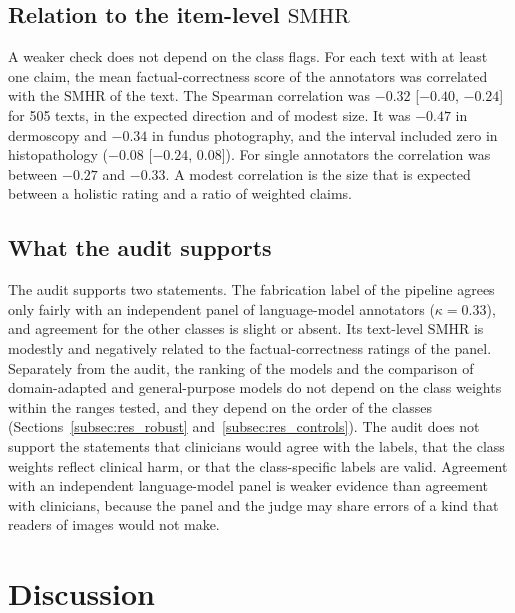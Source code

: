 \documentclass[11pt,a4paper]{article}
\newcommand{\SMHR}{\ensuremath{\mathrm{SMHR}}}
\begin{document}
\subsection{Relation to the item-level \SMHR{}}\label{sec:val_smhr}
A weaker check does not depend on the class flags. For each text with at least one claim, the mean factual-correctness score of the annotators was correlated with the \SMHR{} of the text. The Spearman correlation was $-0.32$ [$-0.40$, $-0.24$] for 505 texts, in the expected direction and of modest size. It was $-0.47$ in dermoscopy and $-0.34$ in fundus photography, and the interval included zero in histopathology ($-0.08$ [$-0.24$, 0.08]). For single annotators the correlation was between $-0.27$ and $-0.33$. A modest correlation is the size that is expected between a holistic rating and a ratio of weighted claims.

\subsection{What the audit supports}\label{sec:val_summary}
The audit supports two statements. The fabrication label of the pipeline agrees only fairly with an independent panel of language-model annotators ($\kappa = 0.33$), and agreement for the other classes is slight or absent. Its text-level \SMHR{} is modestly and negatively related to the factual-correctness ratings of the panel. Separately from the audit, the ranking of the models and the comparison of domain-adapted and general-purpose models do not depend on the class weights within the ranges tested, and they depend on the order of the classes (Sections~\ref{subsec:res_robust} and~\ref{subsec:res_controls}). The audit does not support the statements that clinicians would agree with the labels, that the class weights reflect clinical harm, or that the class-specific labels are valid. Agreement with an independent language-model panel is weaker evidence than agreement with clinicians, because the panel and the judge may share errors of a kind that readers of images would not make.

\section{Discussion}\label{sec:discussion}
\end{document}
